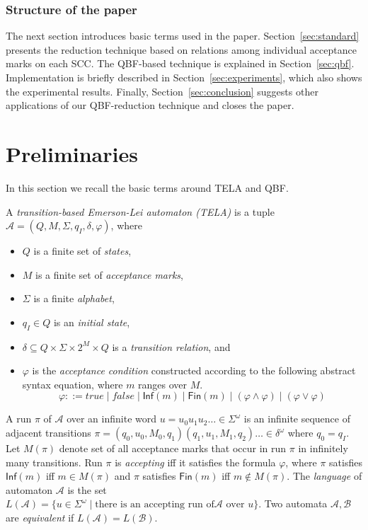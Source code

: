 \documentclass[a4paper,UKenglish,cleveref, autoref, thm-restate]{lipics-v2021}
\def\Inf{\ensuremath{\mathsf{Inf}}}
\def\Fin{\ensuremath{\mathsf{Fin}}}
\def\false{\mathit{false}}
\def\true{\mathit{true}}
\newcommand{\mA}{\mathcal{A}}
\newcommand{\mB}{\mathcal{B}}
\begin{document}
\subsubsection{Structure of the paper} The next section introduces
basic terms used in the paper. Section~\ref{sec:standard} presents the
reduction technique based on relations among individual acceptance
marks on each SCC. The QBF-based technique is explained in
Section~\ref{sec:qbf}. Implementation is briefly described in
Section~\ref{sec:experiments}, which also shows the experimental
results. Finally, Section~\ref{sec:conclusion} suggests other
applications of our QBF-reduction technique and closes the paper.


\section{Preliminaries}\label{sec:prelim}

In this section we recall the basic terms around TELA and QBF.

\begin{definition}[TELA]
  A \emph{transition-based Emerson-Lei automaton (TELA)} is a tuple
  $\mA =(Q,M,\Sigma,q_I,\delta,\varphi)$, where
  \begin{itemize}
  \item $Q$ is a finite set of \emph{states},
  \item $M$ is a finite set of \emph{acceptance marks},
  \item $\Sigma$ is a finite \emph{alphabet},
  \item $q_I\in Q$ is an \emph{initial state},
  \item $\delta \subseteq Q \times \Sigma \times 2^{M} \times Q$ is a
    \emph{transition relation}, and
  \item $\varphi$ is the \emph{acceptance condition} constructed
    according to the following abstract syntax equation, where $m$
    ranges over $M$.
    $$\varphi ::= \true \mid \false \mid \Inf(m) \mid \Fin(m) \mid \left( \varphi \land \varphi \right) \mid \left( \varphi \lor \varphi \right)$$
\end{itemize}
\end{definition}

A run $\pi$ of $\mA$ over an infinite word
$u = u_{0}u_{1}u_{2}\dots \in \Sigma^{\omega}$ is an infinite sequence
of adjacent transitions
$\pi=(q_0,u_0,M_0,q_1)(q_1,u_1,M_1,q_2)\dots\in\delta^{\omega}$ where
$q_0=q_I$. Let $M(\pi)$ denote set of all acceptance marks that occur
in run $\pi$ in infinitely many transitions. Run $\pi$ is
\emph{accepting} iff it satisfies the formula $\varphi$, where $\pi$
satisfies $\Inf(m)$ iff $m\in M(\pi)$ and $\pi$ satisfies $\Fin(m)$
iff $m\not\in M(\pi)$. The \emph{language} of automaton $\mA$ is the
set
$L(\mA)=\{u\in \Sigma^{\omega}\mid\textrm{there is an accepting run of
}\mA\textrm{ over }u\}$. Two automata $\mA,\mB$ are \emph{equivalent}
if $L(\mA)=L(\mB)$.
\end{document}
